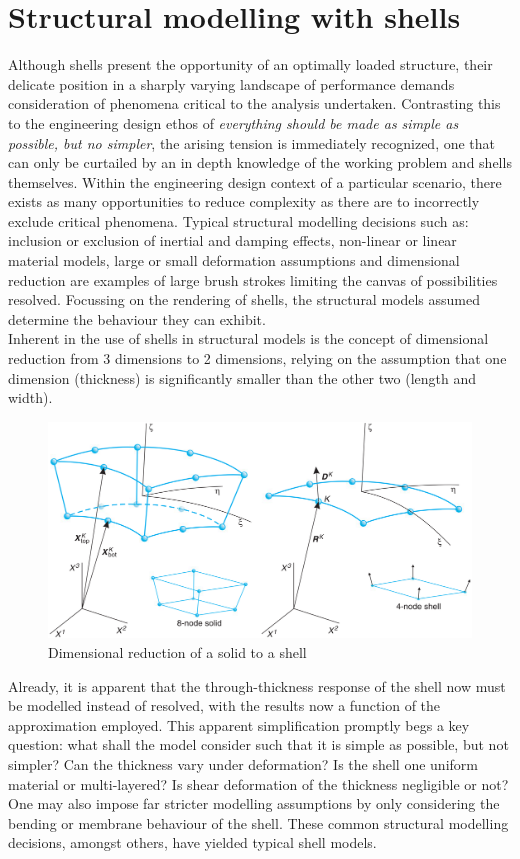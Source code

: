 \section{Structural modelling with shells}
Although shells present the opportunity of an optimally loaded structure, their delicate position in a sharply varying landscape of performance demands consideration of phenomena critical to the analysis undertaken. Contrasting this to the engineering design ethos of \textit{everything should be made as simple as possible, but no simpler}, the arising tension is immediately recognized, one that can only be curtailed by an in depth knowledge of the working problem and shells themselves. Within the engineering design context of a particular scenario, there exists as many opportunities to reduce complexity as there are to incorrectly exclude critical phenomena. Typical structural modelling decisions such as: inclusion or exclusion of inertial and damping effects, non-linear or linear material models, large or small deformation assumptions and dimensional reduction are examples of large brush strokes limiting the canvas of possibilities resolved. Focussing on the rendering of shells, the structural models assumed determine the behaviour they can exhibit. \\

Inherent in the use of shells in structural models is the concept of dimensional reduction from 3 dimensions to 2 dimensions, relying on the assumption that one dimension (thickness) is significantly smaller than the other two (length and width). 

\begin{figure}[H]
	\centering
	\def\svgwidth{\columnwidth}
	\includegraphics[width=12cm]{images/degenerateshell.png}
	\caption{Dimensional reduction of a solid to a shell \cite{BischLitBook04}}
	\label{shellModels}
\end{figure}

Already, it is apparent that the through-thickness response of the shell now must be modelled instead of resolved, with the results now a function of the approximation employed. This apparent simplification promptly begs a key question: what shall the model consider such that it is simple as possible, but not simpler? Can the thickness vary under deformation? Is the shell one uniform material or multi-layered? Is shear deformation of the thickness negligible or not? One may also impose far stricter modelling assumptions by only considering the bending or membrane behaviour of the shell. These common structural modelling decisions, amongst others, have yielded typical shell models.

